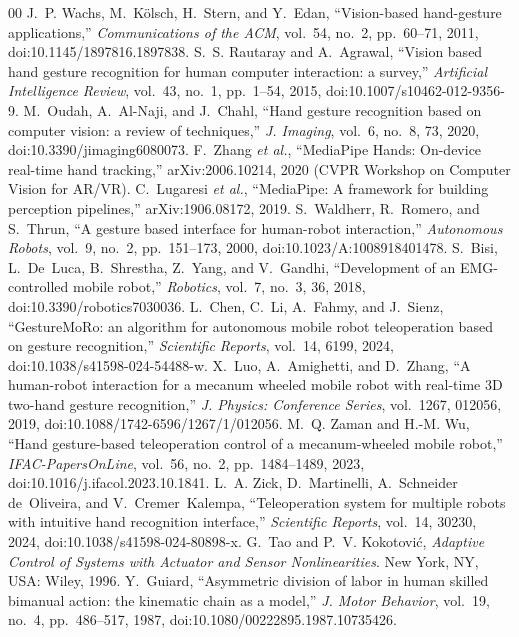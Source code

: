 \documentclass[5p,twocolumn]{elsarticle}
\begin{document}
\begin{thebibliography}{00}
 J.~P. Wachs, M.~K{\"o}lsch, H.~Stern, and Y.~Edan, ``Vision-based hand-gesture applications,'' \emph{Communications of the ACM}, vol.~54, no.~2, pp.~60--71, 2011, doi:10.1145/1897816.1897838.
 S.~S. Rautaray and A.~Agrawal, ``Vision based hand gesture recognition for human computer interaction: a survey,'' \emph{Artificial Intelligence Review}, vol.~43, no.~1, pp.~1--54, 2015, doi:10.1007/s10462-012-9356-9.
 M.~Oudah, A.~Al-Naji, and J.~Chahl, ``Hand gesture recognition based on computer vision: a review of techniques,'' \emph{J. Imaging}, vol.~6, no.~8, 73, 2020, doi:10.3390/jimaging6080073.
 F.~Zhang \emph{et al.}, ``MediaPipe Hands: On-device real-time hand tracking,'' arXiv:2006.10214, 2020 (CVPR Workshop on Computer Vision for AR/VR).
 C.~Lugaresi \emph{et al.}, ``MediaPipe: A framework for building perception pipelines,'' arXiv:1906.08172, 2019.
 S.~Waldherr, R.~Romero, and S.~Thrun, ``A gesture based interface for human-robot interaction,'' \emph{Autonomous Robots}, vol.~9, no.~2, pp.~151--173, 2000, doi:10.1023/A:1008918401478.
 S.~Bisi, L.~De~Luca, B.~Shrestha, Z.~Yang, and V.~Gandhi, ``Development of an EMG-controlled mobile robot,'' \emph{Robotics}, vol.~7, no.~3, 36, 2018, doi:10.3390/robotics7030036.
 L.~Chen, C.~Li, A.~Fahmy, and J.~Sienz, ``GestureMoRo: an algorithm for autonomous mobile robot teleoperation based on gesture recognition,'' \emph{Scientific Reports}, vol.~14, 6199, 2024, doi:10.1038/s41598-024-54488-w.
 X.~Luo, A.~Amighetti, and D.~Zhang, ``A human-robot interaction for a mecanum wheeled mobile robot with real-time 3D two-hand gesture recognition,'' \emph{J. Physics: Conference Series}, vol.~1267, 012056, 2019, doi:10.1088/1742-6596/1267/1/012056.
 M.~Q. Zaman and H.-M. Wu, ``Hand gesture-based teleoperation control of a mecanum-wheeled mobile robot,'' \emph{IFAC-PapersOnLine}, vol.~56, no.~2, pp.~1484--1489, 2023, doi:10.1016/j.ifacol.2023.10.1841.
 L.~A. Zick, D.~Martinelli, A.~Schneider de~Oliveira, and V.~Cremer~Kalempa, ``Teleoperation system for multiple robots with intuitive hand recognition interface,'' \emph{Scientific Reports}, vol.~14, 30230, 2024, doi:10.1038/s41598-024-80898-x.
 G.~Tao and P.~V. Kokotovi{\'c}, \emph{Adaptive Control of Systems with Actuator and Sensor Nonlinearities}. New York, NY, USA: Wiley, 1996.
 Y.~Guiard, ``Asymmetric division of labor in human skilled bimanual action: the kinematic chain as a model,'' \emph{J. Motor Behavior}, vol.~19, no.~4, pp.~486--517, 1987, doi:10.1080/00222895.1987.10735426.

\end{thebibliography}
\end{document}
